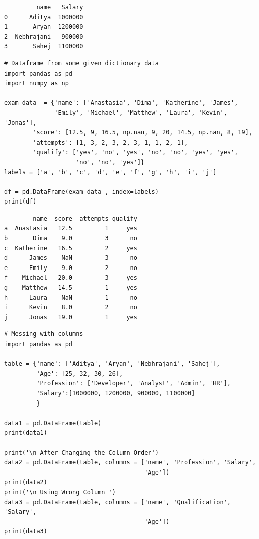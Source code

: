 \documentclass[11pt]{article}
\begin{document}
\begin{verbatim}
         name   Salary
0      Aditya  1000000
1       Aryan  1200000
2  Nebhrajani   900000
3       Sahej  1100000
\end{verbatim}


\begin{verbatim}
# Dataframe from some given dictionary data
import pandas as pd
import numpy as np

exam_data  = {'name': ['Anastasia', 'Dima', 'Katherine', 'James',
              'Emily', 'Michael', 'Matthew', 'Laura', 'Kevin', 'Jonas'],
        'score': [12.5, 9, 16.5, np.nan, 9, 20, 14.5, np.nan, 8, 19],
        'attempts': [1, 3, 2, 3, 2, 3, 1, 1, 2, 1],
        'qualify': ['yes', 'no', 'yes', 'no', 'no', 'yes', 'yes',
                    'no', 'no', 'yes']}
labels = ['a', 'b', 'c', 'd', 'e', 'f', 'g', 'h', 'i', 'j']

df = pd.DataFrame(exam_data , index=labels)
print(df)
\end{verbatim}

\begin{verbatim}
        name  score  attempts qualify
a  Anastasia   12.5         1     yes
b       Dima    9.0         3      no
c  Katherine   16.5         2     yes
d      James    NaN         3      no
e      Emily    9.0         2      no
f    Michael   20.0         3     yes
g    Matthew   14.5         1     yes
h      Laura    NaN         1      no
i      Kevin    8.0         2      no
j      Jonas   19.0         1     yes
\end{verbatim}

\begin{verbatim}
# Messing with columns
import pandas as pd

table = {'name': ['Aditya', 'Aryan', 'Nebhrajani', 'Sahej'],
         'Age': [25, 32, 30, 26],
         'Profession': ['Developer', 'Analyst', 'Admin', 'HR'],
         'Salary':[1000000, 1200000, 900000, 1100000]
         }

data1 = pd.DataFrame(table)
print(data1)

print('\n After Changing the Column Order')
data2 = pd.DataFrame(table, columns = ['name', 'Profession', 'Salary',
                                       'Age'])
print(data2)
print('\n Using Wrong Column ')
data3 = pd.DataFrame(table, columns = ['name', 'Qualification', 'Salary',
                                       'Age'])
print(data3)
\end{verbatim}
\end{document}
